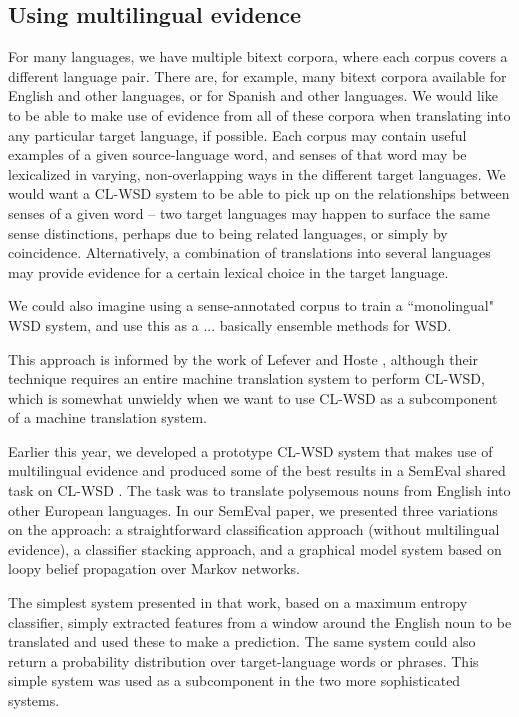 \subsection{Using multilingual evidence}
For many languages, we have multiple bitext corpora, where each corpus covers a
different language pair. There are, for example, many bitext corpora available
for English and other languages, or for Spanish and other languages.
We would like to be able to make use of evidence from all of these corpora when
translating into any particular target language, if possible.
Each corpus may contain useful examples of a given source-language word,
and senses of that word may be lexicalized in varying, non-overlapping ways in
the different target languages.
We would want a CL-WSD system to be able to pick up on the relationships
between senses of a given word -- two target languages may happen to surface
the same sense distinctions, perhaps due to being related languages, or simply
by coincidence. Alternatively, a combination of translations into several
languages may provide evidence for a certain lexical choice in the target
language.

We could also imagine using a sense-annotated corpus to train a ``monolingual"
WSD system, and use this as a 
... basically ensemble methods for WSD.

This approach is informed by the work of Lefever and Hoste
\cite{lefever-hoste-decock:2011:ACL-HLT2011}, although their technique requires
an entire machine translation system to perform CL-WSD, which is somewhat
unwieldy when we want to use CL-WSD as a subcomponent of a machine translation
system.

Earlier this year, we developed a prototype CL-WSD system that makes use of
multilingual evidence \cite{rudnick-liu-gasser:2013:SemEval-2013} and produced
some of the best results in a SemEval shared task on CL-WSD \cite{task10}.
The task was to translate polysemous nouns from English into other European
languages. In our SemEval paper, we presented three variations on the approach:
a straightforward classification approach (without multilingual evidence), a
classifier stacking approach, and a graphical model system based on loopy
belief propagation over Markov networks.

The simplest system presented in that work, based on a maximum entropy
classifier, simply extracted features from a window around the English noun to
be translated and used these to make a prediction. The same system could also
return a probability distribution over target-language words or phrases. This
simple system was used as a subcomponent in the two more sophisticated systems.

